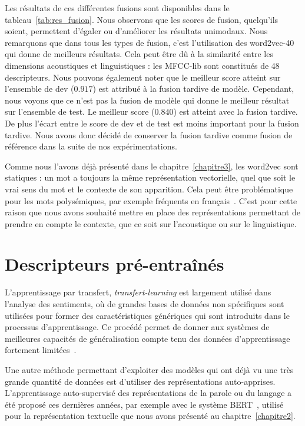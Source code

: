 
Les résultats de ces différentes fusions sont disponibles dans le tableau~\ref{tab:res_fusion}. Nous observons que les scores de fusion, quelqu'ils soient, permettent d'égaler ou d'améliorer les résultats unimodaux. Nous remarquons que dans tous les types de fusion, c'est l'utilisation des word2vec-40 qui donne de meilleurs résultats. Cela peut être dû à la similarité entre les dimensions acoustiques et linguistiques : les MFCC-lib sont constitués de 48 descripteurs.
Nous pouvons également noter que le meilleur score atteint sur l'ensemble de dev ($0.917$) est attribué à la fusion tardive de modèle. Cependant, nous voyons que ce n'est pas la fusion de modèle qui donne le meilleur résultat sur l'ensemble de test. Le meilleur score ($0.840$) est atteint avec la fusion tardive. De plus l'écart entre le score de dev et de test est moins important pour la fusion tardive. Nous avons donc décidé de conserver la fusion tardive comme fusion de référence dans la suite de nos expérimentations.

Comme nous l'avons déjà présenté dans le chapitre~\ref{chapitre3}, les word2vec sont statiques : un mot a toujours la même représentation vectorielle, quel que soit le vrai sens du mot et le contexte de son apparition. Cela peut être problématique pour les mots polysémiques, par exemple fréquents en français~\cite{Pustejovsky1996}. C'est pour cette raison que nous avons souhaité mettre en place des représentations permettant de prendre en compte le contexte, que ce soit sur l'acoustique ou sur le linguistique.

\section{Descripteurs pré-entraînés}

L'apprentissage par transfert, \textit{transfert-learning} est largement utilisé dans l'analyse des sentiments, où de grandes bases de données non spécifiques sont utilisées pour former des caractéristiques génériques qui sont introduits dans le processus d’apprentissage.
Ce procédé permet de donner aux systèmes de meilleures capacités de généralisation compte tenu des données d'apprentissage fortement limitées~\cite{Dong2018}.

Une autre méthode permettant d'exploiter des modèles qui ont déjà vu une très grande quantité de données est d'utiliser des représentations auto-apprises. L'apprentissage auto-supervisé des représentations de la parole ou du langage a été proposé ces dernières années, par exemple avec le système BERT~\cite{Devlin2019}, utilisé pour la représentation textuelle que nous avons présenté au chapitre~\ref{chapitre2}.

